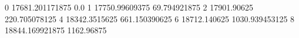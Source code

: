 0 17681.201171875 0.0
1 17750.99609375 69.794921875
2 17901.90625 220.705078125
4 18342.3515625 661.150390625
6 18712.140625 1030.939453125
8 18844.169921875 1162.96875
